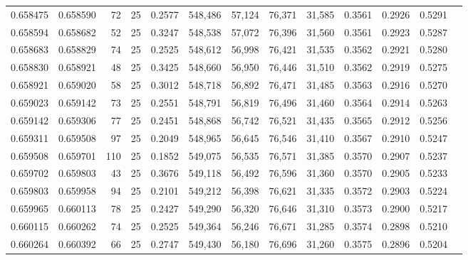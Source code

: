 \begin{tabular}{rrrrrrrrrrrrr}
0.658475 & 0.658590 &    72 &  25 &                                     0.2577 & 548,486 &  57,124 &  76,371 &  31,585 & 0.3561 & 0.2926 & 0.5291 \\
0.658594 & 0.658682 &    52 &  25 &                                     0.3247 & 548,538 &  57,072 &  76,396 &  31,560 & 0.3561 & 0.2923 & 0.5287 \\
0.658683 & 0.658829 &    74 &  25 &                                     0.2525 & 548,612 &  56,998 &  76,421 &  31,535 & 0.3562 & 0.2921 & 0.5280 \\
0.658830 & 0.658921 &    48 &  25 &                                     0.3425 & 548,660 &  56,950 &  76,446 &  31,510 & 0.3562 & 0.2919 & 0.5275 \\
0.658921 & 0.659020 &    58 &  25 &                                     0.3012 & 548,718 &  56,892 &  76,471 &  31,485 & 0.3563 & 0.2916 & 0.5270 \\
0.659023 & 0.659142 &    73 &  25 &                                     0.2551 & 548,791 &  56,819 &  76,496 &  31,460 & 0.3564 & 0.2914 & 0.5263 \\
0.659142 & 0.659306 &    77 &  25 &                                     0.2451 & 548,868 &  56,742 &  76,521 &  31,435 & 0.3565 & 0.2912 & 0.5256 \\
0.659311 & 0.659508 &    97 &  25 &                                     0.2049 & 548,965 &  56,645 &  76,546 &  31,410 & 0.3567 & 0.2910 & 0.5247 \\
0.659508 & 0.659701 &   110 &  25 &                                     0.1852 & 549,075 &  56,535 &  76,571 &  31,385 & 0.3570 & 0.2907 & 0.5237 \\
0.659702 & 0.659803 &    43 &  25 &                                     0.3676 & 549,118 &  56,492 &  76,596 &  31,360 & 0.3570 & 0.2905 & 0.5233 \\
0.659803 & 0.659958 &    94 &  25 &                                     0.2101 & 549,212 &  56,398 &  76,621 &  31,335 & 0.3572 & 0.2903 & 0.5224 \\
0.659965 & 0.660113 &    78 &  25 &                                     0.2427 & 549,290 &  56,320 &  76,646 &  31,310 & 0.3573 & 0.2900 & 0.5217 \\
0.660115 & 0.660262 &    74 &  25 &                                     0.2525 & 549,364 &  56,246 &  76,671 &  31,285 & 0.3574 & 0.2898 & 0.5210 \\
0.660264 & 0.660392 &    66 &  25 &                                     0.2747 & 549,430 &  56,180 &  76,696 &  31,260 & 0.3575 & 0.2896 & 0.5204 \\

\end{tabular}
